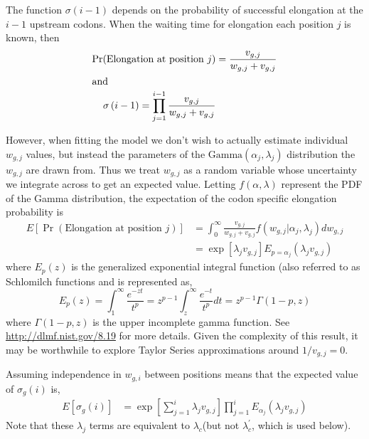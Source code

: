 \documentclass{article}
\newcommand{\waitTerm}{\ensuremath{w}\xspace}
\newcommand{\wgi}{\ensuremath{\waitTerm_{g,i}}\xspace}
\newcommand{\wgj}{\ensuremath{\waitTerm_{g,j}}\xspace}
\newcommand{\alphaj}{\ensuremath{{\alpha_j}}\xspace}
\newcommand{\lambdac}{\ensuremath{{\lambda_c}}\xspace}
\newcommand{\lambdacprime}{\ensuremath{{\lambda_c^\prime}}\xspace}
\newcommand{\lambdaj}{\ensuremath{{\lambda_j}}\xspace}
\newcommand{\nseTerm}{\ensuremath{v}\xspace}
\newcommand{\vgj}{\ensuremath{\nseTerm_{g,j}}\xspace}
\newcommand{\sigmag}{\ensuremath{\sigma_{g}}\xspace}
\newcommand{\Esigmagi}{\ensuremath{E\left[\sigma_{g}(i)\right]}\xspace}
\begin{document}
The function $\sigma(i-1)$ depends on the probability of successful elongation at the $i-1$ upstream codons.
When the waiting time for elongation each position $j$ is known, then
 \begin{align}
  \label{eq:defElongPr}
\Pr(\text{Elongation at position $j$}) &=\frac{\vgj}{\wgj + \vgj} \\
\intertext{and}
   \label{eq:defSigmag}
   \sigma\left(i-1\right) = \prod_{j=1}^{i-1} \frac{\vgj}{\wgj + \vgj}
\end{align}

However, when fitting the model we don't wish to actually estimate individual \wgj values, but instead the parameters of the $\text{Gamma}\left(\alphaj, \lambdaj\right)$ distribution the \wgj are drawn from.
Thus we treat \wgj as a random variable whose uncertainty we integrate across to get an expected value.
Letting $f(\alpha, \lambda)$ represent the PDF of the Gamma distribution, the expectation of the codon specific elongation probability is
\begin{align}
  \label{eq:defEElongPr}
E\left[\Pr(\text{Elongation at position $j$})\right] &= \int_0^\infty \frac{\vgj}{\wgj + \vgj} f\left(\wgj | \alphaj, \lambdaj\right) d\wgj\\
 &= \exp\left[\lambdaj \vgj\right] E_{p = \alphaj}\left(\lambdaj \vgj\right)
\end{align}
where $E_p(z)$ is the generalized exponential integral function (also referred to as Schlomilch functions \citep[][p.380]{OldhamEtAl2009} and is represented as,
\begin{equation}
  \label{eq:defGeneralizedExpoInt}
   E_p(z) = \int_1^\infty \frac{e^{-z t}}{t^p} = z^{p-1} \int_z^\infty \frac{e^{-t}}{t^p} dt = z^{p-1} \Gamma(1-p,z)
\end{equation}
where $\Gamma(1-p,z)$ is the upper incomplete gamma function.
See \href{http://dlmf.nist.gov/8.19}{http://dlmf.nist.gov/8.19} for more details.
Given the complexity of this result, it may be worthwhile to explore Taylor Series approximations around $1/\vgj = 0$. 

Assuming independence in \wgi between positions means that the expected value of $\sigmag(i)$ is, 
\begin{align}
  \label{eq:defESigmag}
  \Esigmagi &=  \exp\left[\sum_{j=1}^i \lambdaj \vgj\right]  \prod_{j=1}^{i} E_{\alphaj}\left(\lambdaj \vgj\right)
\end{align}
Note that these \lambdaj terms are equivalent to \lambdac (but not \lambdacprime, which is used below).
\end{document}
